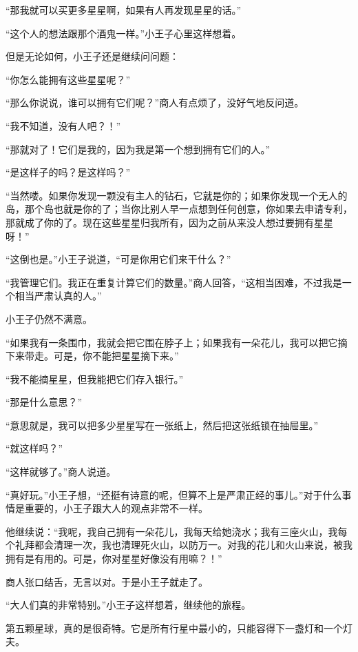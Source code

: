 “那我就可以买更多星星啊，如果有人再发现星星的话。”

“这个人的想法跟那个酒鬼一样。”小王子心里这样想着。

但是无论如何，小王子还是继续问问题：

“你怎么能拥有这些星星呢？”

“那么你说说，谁可以拥有它们呢？”商人有点烦了，没好气地反问道。

“我不知道，没有人吧？！”

“那就对了！它们是我的，因为我是第一个想到拥有它们的人。”

“是这样子的吗？是这样吗？”

“当然喽。如果你发现一颗没有主人的钻石，它就是你的；如果你发现一个无人的岛，那个岛也就是你的了；当你比别人早一点想到任何创意，你如果去申请专利，那就成了你的了。现在这些星星归我所有，因为之前从来没人想过要拥有星星呀！”

“这倒也是。”小王子说道，“可是你用它们来干什么？”

“我管理它们。我正在重复计算它们的数量。”商人回答，“这相当困难，不过我是一个相当严肃认真的人。”

小王子仍然不满意。

“如果我有一条围巾，我就会把它围在脖子上；如果我有一朵花儿，我可以把它摘下来带走。可是，你不能把星星摘下来。”

“我不能摘星星，但我能把它们存入银行。”

“那是什么意思？”

“意思就是，我可以把多少星星写在一张纸上，然后把这张纸锁在抽屉里。”

“就这样吗？”

“这样就够了。”商人说道。

“真好玩。”小王子想，“还挺有诗意的呢，但算不上是严肃正经的事儿。”对于什么事情是重要的，小王子跟大人的观点非常不一样。

他继续说：“我呢，我自己拥有一朵花儿，我每天给她浇水；我有三座火山，我每个礼拜都会清理一次，我也清理死火山，以防万一。对我的花儿和火山来说，被我拥有是有用的。可是，你对星星好像没有用嘛？！”

商人张口结舌，无言以对。于是小王子就走了。

“大人们真的非常特别。”小王子这样想着，继续他的旅程。


\stoptitle

\starttitle[title={14}]

第五颗星球，真的是很奇特。它是所有行星中最小的，只能容得下一盏灯和一个灯夫。

